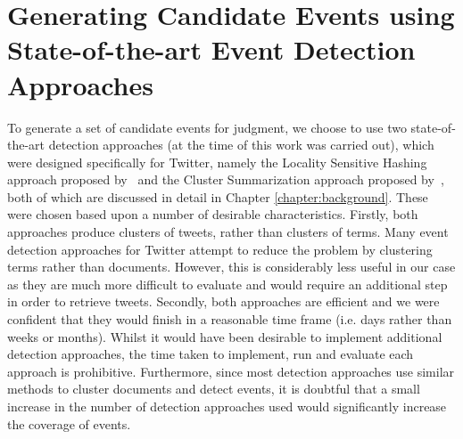 \section{Generating Candidate Events using State-of-the-art Event Detection Approaches}

To generate a set of candidate events for judgment, we choose to use two state-of-the-art detection approaches (at the time of this work was carried out), which were designed specifically for Twitter, namely the Locality Sensitive Hashing approach proposed by~\cite{Petrovic:2010:SFS:1857999.1858020} and the Cluster Summarization approach proposed by~\cite{Aggarwal12}, both of which are discussed in detail in Chapter \ref{chapter:background}.
These were chosen based upon a number of desirable characteristics.
Firstly, both approaches produce clusters of tweets, rather than clusters of terms.
Many event detection approaches for Twitter attempt to reduce the problem by clustering terms rather than documents.
However, this is considerably less useful in our case as they are much more difficult to evaluate and would require an additional step in order to retrieve tweets.
Secondly, both approaches are efficient and we were confident that they would finish in a reasonable time frame (i.e. days rather than weeks or months).
Whilst it would have been desirable to implement additional detection approaches, the time taken to implement, run and evaluate each approach is prohibitive.
Furthermore, since most detection approaches use similar methods to cluster documents and detect events, it is doubtful that a small increase in the number of detection approaches used would significantly increase the coverage of events.

